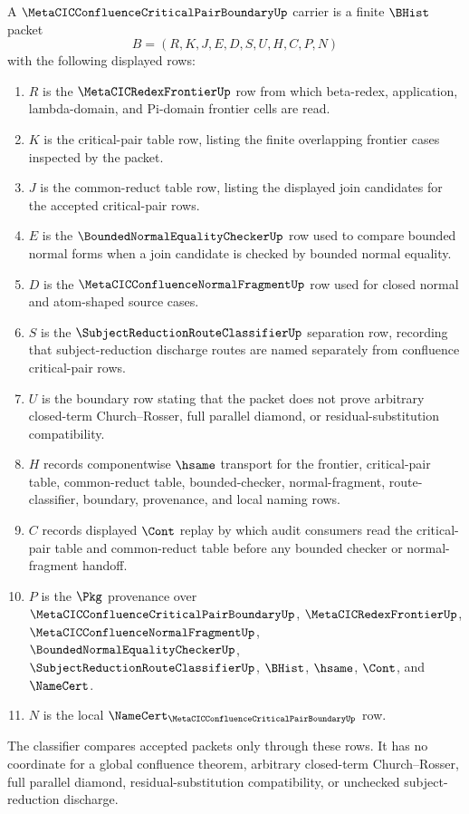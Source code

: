 \begin{definition}
\label{def:metacic-confluence-critical-pair-boundary-carrier}
A $\MetaCICConfluenceCriticalPairBoundaryUp$ carrier is a finite $\BHist$
packet
$$
B=(R,K,J,E,D,S,U,H,C,P,N)
$$
with the following displayed rows:
\begin{enumerate}
\item $R$ is the $\MetaCICRedexFrontierUp$ row from which beta-redex,
application, lambda-domain, and Pi-domain frontier cells are read.
\item $K$ is the critical-pair table row, listing the finite overlapping
frontier cases inspected by the packet.
\item $J$ is the common-reduct table row, listing the displayed join candidates
for the accepted critical-pair rows.
\item $E$ is the $\BoundedNormalEqualityCheckerUp$ row used to compare bounded
normal forms when a join candidate is checked by bounded normal equality.
\item $D$ is the $\MetaCICConfluenceNormalFragmentUp$ row used for closed
normal and atom-shaped source cases.
\item $S$ is the $\SubjectReductionRouteClassifierUp$ separation row, recording
that subject-reduction discharge routes are named separately from confluence
critical-pair rows.
\item $U$ is the boundary row stating that the packet does not prove arbitrary
closed-term Church--Rosser, full parallel diamond, or residual-substitution
compatibility.
\item $H$ records componentwise $\hsame$ transport for the frontier,
critical-pair table, common-reduct table, bounded-checker, normal-fragment,
route-classifier, boundary, provenance, and local naming rows.
\item $C$ records displayed $\Cont$ replay by which audit consumers read the
critical-pair table and common-reduct table before any bounded checker or
normal-fragment handoff.
\item $P$ is the $\Pkg$ provenance over $\MetaCICConfluenceCriticalPairBoundaryUp$,
$\MetaCICRedexFrontierUp$, $\MetaCICConfluenceNormalFragmentUp$,
$\BoundedNormalEqualityCheckerUp$, $\SubjectReductionRouteClassifierUp$,
$\BHist$, $\hsame$, $\Cont$, and $\NameCert$.
\item $N$ is the local
$\NameCert_{\MetaCICConfluenceCriticalPairBoundaryUp}$ row.
\end{enumerate}
The classifier compares accepted packets only through these rows. It has no
coordinate for a global confluence theorem, arbitrary closed-term
Church--Rosser, full parallel diamond, residual-substitution compatibility, or
unchecked subject-reduction discharge.
\end{definition}

